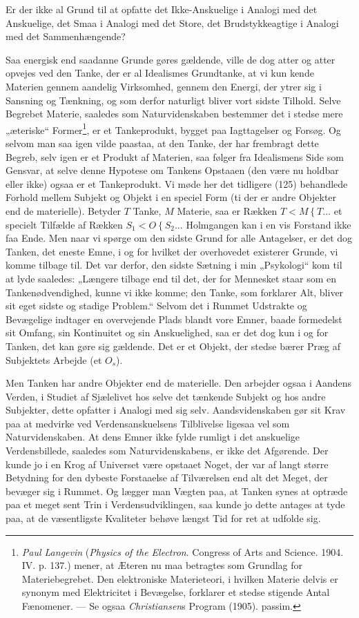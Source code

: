 \documentclass[12pt,a4paper]{book}
\newcommand{\apage}[1]{\marginnote{\footnotesize\textit{[#1]}}}
\begin{document}
Er der ikke al Grund til at opfatte det Ikke-Anskuelige i Analogi med det Anskuelige, det
Smaa i Analogi med det Store, det Brudstykkeagtige i Analogi med det Sammenhængende?

Saa energisk end saadanne Grunde gøres gældende, ville de dog atter og atter opvejes ved
den Tanke, der er al Idealismes Grundtanke, at vi kun kende Materien gennem aandelig
Virksomhed, gennem den Energi, der ytrer sig i Sansning og Tænkning, og som derfor
naturligt bliver vort sidste Tilhold. Selve Begrebet Materie, saaledes som
Naturvidenskaben bestemmer det i stedse mere „æteriske“ Former\footnote{\emph{Paul
Langevin} (\emph{Physics of the Electron}. Congress of Arts and Science. 1904. IV. p.
137.) mener, at Æteren nu maa betragtes som Grundlag for Materiebegrebet. Den elektroniske
Materieteori, i hvilken Materie delvis er synonym med Elektricitet i Bevægelse, forklarer
et stedse stigende Antal Fænomener. --- Se ogsaa \emph{Christiansen}s Program (1905).
passim.}, \apage{332} er et Tankeprodukt, bygget paa Iagttagelser og Forsøg. Og selvom man saa igen
vilde paastaa, at den Tanke, der har frembragt dette Begreb, selv igen er et Produkt af
Materien, saa følger fra Idealismens Side som Gensvar, at selve denne Hypotese om Tankens
Opstaaen (den være nu holdbar eller ikke) ogsaa er et Tankeprodukt. Vi møde her det
tidligere (125) behandlede Forhold mellem Subjekt og Objekt i en speciel Form (ti der er
andre Objekter end de materielle). Betyder $T$ Tanke, $M$ Materie, saa er Rækken
$T < M \mathrel{\{} T \ldots$ et specielt Tilfælde af Rækken $S_1 < O \mathrel{\{} S_2
\ldots$ Holmgangen kan i en vis Forstand ikke faa Ende. Men naar vi spørge om den sidste
Grund for alle Antagelser, er det dog Tanken, det eneste Emne, i og for hvilket der
overhovedet existerer Grunde, vi komme tilbage til. Det var derfor, den sidste Sætning i
min „Psykologi“ kom til at lyde saaledes: „Længere tilbage end til det, der for Mennesket
staar som en Tankenødvendighed, kunne vi ikke komme; den Tanke, som forklarer Alt, bliver sit eget sidste og stadige Problem.“ Selvom det i Rummet Udstrakte og Bevægelige indtager en
overvejende Plads blandt vore Emner, baade formedelst sit Omfang, sin Kontinuitet og sin
Anskuelighed, saa er det dog kun i og for Tanken, det kan gøre sig gældende. Det er et
Objekt, der stedse bærer Præg af Subjektets Arbejde (et $O_s$).

Men Tanken har andre Objekter end de materielle. Den arbejder ogsaa i Aandens Verden, i
Studiet af Sjælelivet hos selve det tænkende Subjekt og hos andre Subjekter, dette opfatter
i Analogi med sig selv. Aandsvidenskaben gør sit Krav paa at medvirke ved
Verdensanskuelsens Tilblivelse ligesaa vel som Naturvidenskaben. At dens Emner ikke fylde
rumligt i det anskuelige Verdensbillede, saaledes som Naturvidenskabens, er ikke det
Afgørende. Der kunde jo i en Krog af Universet være opstaaet Noget, der var af langt større
Betydning for den dybeste Forstaaelse af Tilværelsen end alt det Meget, der bevæger sig i
Rummet. Og lægger man Vægten paa, at Tanken synes at optræde paa et meget sent Trin i
Verdensudviklingen, saa kunde jo dette \apage{333} antages at tyde paa, at de væsentligste Kvaliteter
behøve længst Tid for ret at udfolde sig.
\end{document}
